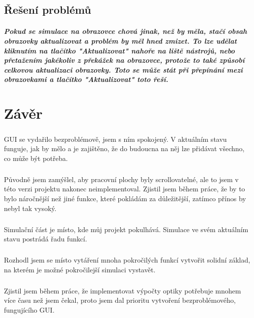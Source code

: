 \documentclass[12pt,a4paper]{report}
\begin{document}
\section{Řešení problémů}
\paragraph{Pokud se simulace na obrazovce chová jinak, než by měla, stačí obsah obrazovky aktualizovat a problém by měl hned zmizet. To lze udělat kliknutím na tlačítko "Aktualizovat" nahoře na liště nástrojů, nebo přetažením jakékoliv z překážek na obrazovce, protože to také způsobí celkovou aktualizaci obrazovky. Toto se může stát při přepínání mezi obrazovkami a tlačítko "Aktualizovat" toto řeší.}

\chapter{Závěr}
\paragraph{} GUI se vydařilo bezproblémově, jsem s ním spokojený. V aktuálním stavu funguje, jak by mělo a je zajištěno, že do budoucna na něj lze přidávat všechno, co může být potřeba.
\paragraph{} Původně jsem zamýšlel, aby pracovní plochy byly scrollovatelné, ale to jsem v této verzi projektu nakonec neimplementoval. Zjistil jsem během práce, že by to bylo náročnější než jiné funkce, které pokládám za důležitější, zatímco přínos by nebyl tak vysoký.
\paragraph{} Simulační část je místo, kde můj projekt pokulhává. Simulace ve svém aktuálním stavu postrádá řadu funkcí.
\paragraph{} Rozhodl jsem se místo vytáření mnoha pokročilých funkcí vytvořit solidní základ, na kterém je možné pokročilejší simulaci vystavět.
\paragraph{} Zjistil jsem během práce, že implementovat výpočty optiky potřebuje mnohem více času než jsem čekal, proto jsem dal prioritu vytvoření bezproblémového, fungujícího GUI.
\end{document}
